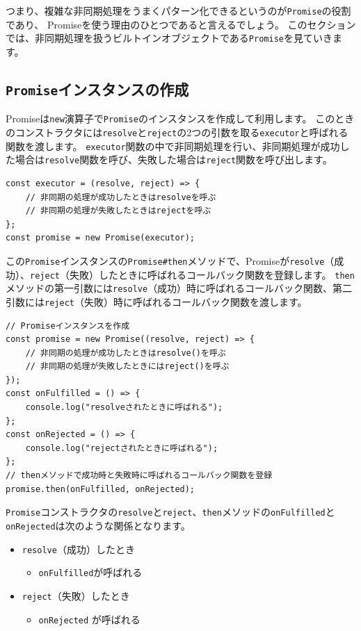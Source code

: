 つまり、複雑な非同期処理をうまくパターン化できるというのが\texttt{Promise}の役割であり、
Promiseを使う理由のひとつであると言えるでしょう。
このセクションでは、非同期処理を扱うビルトインオブジェクトである\texttt{Promise}を見ていきます。

\hypertarget{promise-instance}{%
\subsection{\texorpdfstring{\texttt{Promise}インスタンスの作成}{Promiseインスタンスの作成}}\label{promise-instance}}

Promiseは\texttt{new}演算子で\texttt{Promise}のインスタンスを作成して利用します。
このときのコンストラクタには\texttt{resolve}と\texttt{reject}の2つの引数を取る\texttt{executor}と呼ばれる関数を渡します。
\texttt{executor}関数の中で非同期処理を行い、非同期処理が成功した場合は\texttt{resolve}関数を呼び、失敗した場合は\texttt{reject}関数を呼び出します。

\begin{lstlisting}
const executor = (resolve, reject) => {
    // 非同期の処理が成功したときはresolveを呼ぶ
    // 非同期の処理が失敗したときはrejectを呼ぶ
};
const promise = new Promise(executor);
\end{lstlisting}

この\texttt{Promise}インスタンスの\texttt{Promise\#then}メソッドで、Promiseが\texttt{resolve}（成功）、\texttt{reject}（失敗）したときに呼ばれるコールバック関数を登録します。
\texttt{then}メソッドの第一引数には\texttt{resolve}（成功）時に呼ばれるコールバック関数、第二引数には\texttt{reject}（失敗）時に呼ばれるコールバック関数を渡します。

\begin{lstlisting}
// Promiseインスタンスを作成
const promise = new Promise((resolve, reject) => {
    // 非同期の処理が成功したときはresolve()を呼ぶ
    // 非同期の処理が失敗したときにはreject()を呼ぶ
});
const onFulfilled = () => {
    console.log("resolveされたときに呼ばれる");
};
const onRejected = () => {
    console.log("rejectされたときに呼ばれる");
};
// thenメソッドで成功時と失敗時に呼ばれるコールバック関数を登録
promise.then(onFulfilled, onRejected);
\end{lstlisting}

\texttt{Promise}コンストラクタの\texttt{resolve}と\texttt{reject}、\texttt{then}メソッドの\texttt{onFulfilled}と\texttt{onRejected}は次のような関係となります。

\begin{itemize}
\item
  \texttt{resolve}（成功）したとき

  \begin{itemize}
  \item
    \texttt{onFulfilled}が呼ばれる
  \end{itemize}
\item
  \texttt{reject}（失敗）したとき

  \begin{itemize}
  \item
    \texttt{onRejected} が呼ばれる
  \end{itemize}
\end{itemize}

